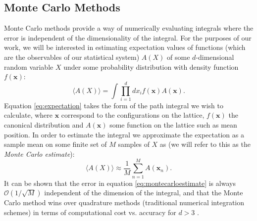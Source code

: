 \documentclass[12pt]{article}
\begin{document}
    \subsection{Monte Carlo Methods}
    Monte Carlo methods provide a way of numerically evaluating integrals where the error is independent of the dimensionality of the integral. For the purposes of our work, we will be interested in estimating expectation values of functions (which are the observables of our statistical system) $A\left(X\right)$ of some $d$-dimensional random variable $X$ under some probability distribution with density function $f\left(\bm{x}\right)$:
    \begin{equation}
        \label{eq:expectation}
        \langle A\left(X\right) \rangle = \int \prod_{i=1}^{d}{dx_i}f\left(\bm{x}\right)A\left(\bm{x}\right).
    \end{equation}
    Equation \ref{eq:expectation} takes the form of the path integral we wish to calculate, where $\bm{x}$ correspond to the configurations on the lattice, $f\left(\bm{x}\right)$ the canonical distribution and $A\left(\bm{x}\right)$ some function on the lattice such as mean position. In order to estimate the integral we approximate the expectation as a sample mean on some finite set of $M$ samples of $X$ as (we will refer to this as the \textit{Monte Carlo estimate}):
    \begin{equation}
        \label{eq:montecarloestimate}
        \langle A\left(X\right)\rangle \approx \frac{1}{M} \sum_{n=1}^{M}A\left(\bm{x}_n\right).
    \end{equation}
    It can be shown that the error in equation \ref{eq:montecarloestimate} is always $\mathcal{O}\left(1/\sqrt{M}\right)$ independent of the dimension of the integral, and that the Monte Carlo method wins over quadrature methods (traditional numerical integration schemes) in terms of computational cost vs. accuracy for $d>3$ \cite{gattringer_lang_2013}.
\end{document}
